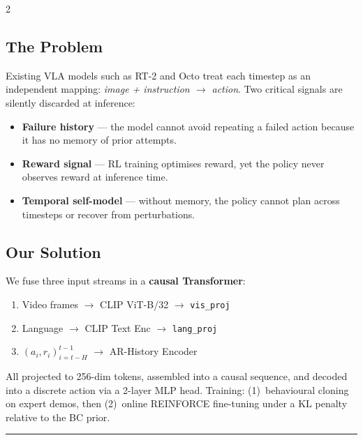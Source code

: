 \documentclass[11pt, a4paper]{article}
\begin{document}
\begin{multicols}{2}
\setlength{\parskip}{1pt}

\subsection*{The Problem}
Existing VLA models such as RT-2 and Octo treat each timestep as an
independent mapping: \emph{image + instruction $\to$ action}.
Two critical signals are silently discarded at inference:
\begin{itemize}[leftmargin=1.1em, itemsep=0pt, topsep=1pt]
  \item \textbf{Failure history} --- the model cannot avoid repeating
        a failed action because it has no memory of prior attempts.
  \item \textbf{Reward signal} --- RL training optimises reward, yet the
        policy never observes reward at inference time.
  \item \textbf{Temporal self-model} --- without memory, the policy
        cannot plan across timesteps or recover from perturbations.
\end{itemize}

\columnbreak

\subsection*{Our Solution}
We fuse three input streams in a \textbf{causal Transformer}:
\begin{enumerate}[leftmargin=1.3em, itemsep=0pt, topsep=1pt]
  \item Video frames $\to$ CLIP ViT-B/32 $\to$ \texttt{vis\_proj}
  \item Language $\to$ CLIP Text Enc $\to$ \texttt{lang\_proj}
  \item $(a_i, r_i)_{i=t-H}^{t-1}$ $\to$ AR-History Encoder
\end{enumerate}
All projected to 256-dim tokens, assembled into a causal sequence, and
decoded into a discrete action via a 2-layer MLP head.
Training: (1)~behavioural cloning on expert demos, then (2)~online
REINFORCE fine-tuning under a KL penalty relative to the BC prior.
\end{multicols}

\vspace{2pt}
{\color{DimGray}\rule{\linewidth}{0.3pt}}
\vspace{2pt}
\end{document}
